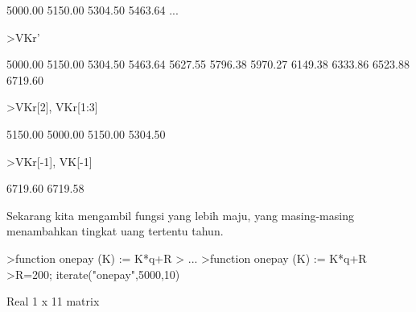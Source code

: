 \documentclass[a4paper,10pt]{article}
\begin{document}
\begin{eulernotebook}
\begin{eulercomment}
\begin{eulercomment}
\begin{eulercomment}
\begin{eulercomment}
\begin{eulercomment}
\begin{eulercomment}
\begin{eulercomment}
\begin{eulercomment}
\begin{eulercomment}
\begin{eulercomment}
\begin{eulercomment}
\begin{eulercomment}
\begin{eulercomment}
\begin{eulercomment}
\begin{eulercomment}
\begin{eulercomment}
\begin{eulercomment}
\begin{eulercomment}
\begin{eulercomment}
\begin{eulercomment}
\begin{eulercomment}
\begin{eulercomment}
\begin{eulercomment}
\begin{eulercomment}
\begin{eulercomment}
\begin{eulercomment}
\begin{eulercomment}
\begin{eulercomment}
\begin{eulercomment}
\begin{eulercomment}
\begin{eulercomment}
\begin{eulercomment}
\begin{euleroutput}
      5000.00     5150.00     5304.50     5463.64     ...
\end{euleroutput}
\begin{eulerprompt}
>VKr'
\end{eulerprompt}
\begin{euleroutput}
      5000.00 
      5150.00 
      5304.50 
      5463.64 
      5627.55 
      5796.38 
      5970.27 
      6149.38 
      6333.86 
      6523.88 
      6719.60 
\end{euleroutput}
\begin{eulerprompt}
>VKr[2], VKr[1:3]
\end{eulerprompt}
\begin{euleroutput}
      5150.00 
      5000.00     5150.00     5304.50 
\end{euleroutput}
\begin{eulerprompt}
>VKr[-1], VK[-1]
\end{eulerprompt}
\begin{euleroutput}
      6719.60 
      6719.58 
\end{euleroutput}
\begin{eulercomment}
\begin{eulercomment}
\begin{eulercomment}
Sekarang kita mengambil fungsi yang lebih maju, yang masing-masing
menambahkan tingkat uang tertentu tahun.
\end{eulercomment}
\begin{eulerprompt}
>function onepay (K) := K*q+R
> ...
>function onepay (K) := K*q+R
>R=200; iterate("onepay",5000,10)
\end{eulerprompt}
\begin{euleroutput}
  Real 1 x 11 matrix
  

\end{euleroutput}
\end{eulercomment}
\end{eulercomment}
\end{eulercomment}
\end{eulercomment}
\end{eulercomment}
\end{eulercomment}
\end{eulercomment}
\end{eulercomment}
\end{eulercomment}
\end{eulercomment}
\end{eulercomment}
\end{eulercomment}
\end{eulercomment}
\end{eulercomment}
\end{eulercomment}
\end{eulercomment}
\end{eulercomment}
\end{eulercomment}
\end{eulercomment}
\end{eulercomment}
\end{eulercomment}
\end{eulercomment}
\end{eulercomment}
\end{eulercomment}
\end{eulercomment}
\end{eulercomment}
\end{eulercomment}
\end{eulercomment}
\end{eulercomment}
\end{eulercomment}
\end{eulercomment}
\end{eulercomment}
\end{eulercomment}
\end{eulercomment}
\end{eulernotebook}
\end{document}
